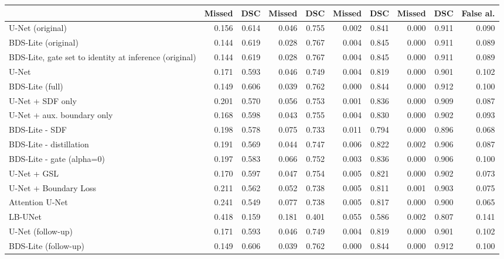 \begin{tabular}{@{}lrrrrrrrrr@{}}
 & Missed & DSC & Missed & DSC & Missed & DSC & Missed & DSC & False al. \\
\midrule
U-Net (original) & 0.156 & 0.614 & 0.046 & 0.755 & 0.002 & 0.841 & 0.000 & 0.911 & 0.090 \\
BDS-Lite (original) & 0.144 & 0.619 & 0.028 & 0.767 & 0.004 & 0.845 & 0.000 & 0.911 & 0.089 \\
BDS-Lite, gate set to identity at inference (original) & 0.144 & 0.619 & 0.028 & 0.767 & 0.004 & 0.845 & 0.000 & 0.911 & 0.089 \\
U-Net & 0.171 & 0.593 & 0.046 & 0.749 & 0.004 & 0.819 & 0.000 & 0.901 & 0.102 \\
BDS-Lite (full) & 0.149 & 0.606 & 0.039 & 0.762 & 0.000 & 0.844 & 0.000 & 0.912 & 0.100 \\
U-Net + SDF only & 0.201 & 0.570 & 0.056 & 0.753 & 0.001 & 0.836 & 0.000 & 0.909 & 0.087 \\
U-Net + aux. boundary only & 0.168 & 0.598 & 0.043 & 0.755 & 0.004 & 0.830 & 0.000 & 0.902 & 0.093 \\
BDS-Lite - SDF & 0.198 & 0.578 & 0.075 & 0.733 & 0.011 & 0.794 & 0.000 & 0.896 & 0.068 \\
BDS-Lite - distillation & 0.191 & 0.569 & 0.044 & 0.747 & 0.006 & 0.822 & 0.002 & 0.906 & 0.087 \\
BDS-Lite - gate (alpha=0) & 0.197 & 0.583 & 0.066 & 0.752 & 0.003 & 0.836 & 0.000 & 0.906 & 0.100 \\
U-Net + GSL & 0.170 & 0.597 & 0.047 & 0.754 & 0.005 & 0.821 & 0.000 & 0.902 & 0.073 \\
U-Net + Boundary Loss & 0.211 & 0.562 & 0.052 & 0.738 & 0.005 & 0.811 & 0.001 & 0.903 & 0.075 \\
Attention U-Net & 0.241 & 0.549 & 0.077 & 0.738 & 0.005 & 0.817 & 0.000 & 0.900 & 0.065 \\
LB-UNet & 0.418 & 0.159 & 0.181 & 0.401 & 0.055 & 0.586 & 0.002 & 0.807 & 0.141 \\
U-Net (follow-up) & 0.171 & 0.593 & 0.046 & 0.749 & 0.004 & 0.819 & 0.000 & 0.901 & 0.102 \\
BDS-Lite (follow-up) & 0.149 & 0.606 & 0.039 & 0.762 & 0.000 & 0.844 & 0.000 & 0.912 & 0.100 \\
\bottomrule
\end{tabular}
